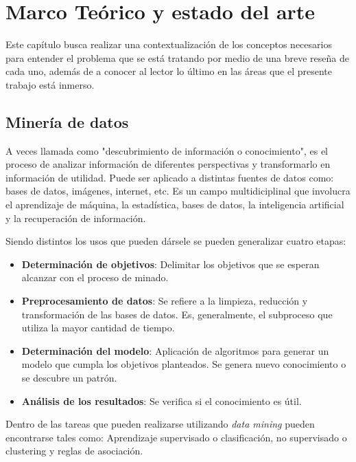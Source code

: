 \chapter{Marco Teórico y estado del arte}
\label{cap:MarcTeorico}

Este capítulo busca realizar una contextualización de los conceptos necesarios para entender el problema que se está tratando por medio de una breve reseña de cada uno, además de a conocer al lector lo último en las áreas que el presente trabajo está inmerso. 

\section{Minería de datos}
\label{sec:dateMine}

A veces llamada como "descubrimiento de información o conocimiento", es el proceso de analizar información de diferentes perspectivas y transformarlo en información de utilidad. Puede ser aplicado a distintas fuentes de datos como: bases de datos, imágenes, internet, etc. Es un campo multidiciplinal que involucra el aprendizaje de máquina, la estadística, bases de datos, la inteligencia artificial y la recuperación de información.

Siendo distintos los usos que pueden dársele se pueden generalizar cuatro etapas:

\begin{itemize}
\item \textbf{Determinación de objetivos}: Delimitar los objetivos que se esperan alcanzar con el proceso de minado.
\item \textbf{Preprocesamiento de datos}: Se refiere a la limpieza, reducción y transformación de las bases de datos. Es, generalmente, el subproceso que utiliza la mayor cantidad de tiempo.
\item \textbf{Determinación del modelo}: Aplicación de algoritmos para generar un modelo que cumpla los objetivos planteados. Se genera nuevo conocimiento o se descubre un patrón.
\item \textbf{Análisis de los resultados}: Se verifica si el conocimiento es útil.
\end{itemize}

Dentro de las tareas que pueden realizarse utilizando \textit{data mining} pueden encontrarse tales como: Aprendizaje supervisado o clasificación, no supervisado o clustering y reglas de asociación.

